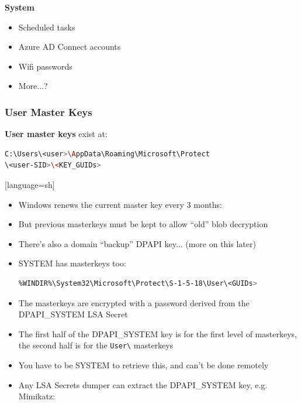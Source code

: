 \textbf{System}
\begin{itemize}
    \item Scheduled tasks
    \item Azure AD Connect accounts
    \item Wifi passwords
    \item More...?
\end{itemize}

\subsubsection*{User Master Keys}

\textbf{User master keys} exist at:
\begin{lstlisting}[language=sh]
C:\Users\<user>\AppData\Roaming\Microsoft\Protect
\<user-SID>\<KEY_GUIDs>
\end{lstlisting}[language=sh]

    \begin{itemize}
    \item Windows renews the current master key every 3 months:
    \item But previous masterkeys must be kept to allow “old” blob decryption
    \item There’s also a domain “backup” DPAPI key... (more on this later)
\end{itemize}

\begin{itemize}
   \item SYSTEM has masterkeys too:
   \begin{lstlisting}[language=sh]
%WINDIR%\System32\Microsoft\Protect\S-1-5-18\<GUIDs>
%WINDIR%\System32\Microsoft\Protect\S-1-5-18\User\<GUIDs> 
   \end{lstlisting}
   
   \item The masterkeys are encrypted with a password derived from the DPAPI\_SYSTEM LSA Secret
   
   \item The first half of the DPAPI\_SYSTEM key is for the first level of masterkeys, the second half is for the \texttt{User\textbackslash} masterkeys
   
   \item You have to be SYSTEM to retrieve this, and can't be done remotely
   
   \item Any LSA Secrets dumper can extract the DPAPI\_SYSTEM key, e.g. Mimikatz:
\end{itemize}

